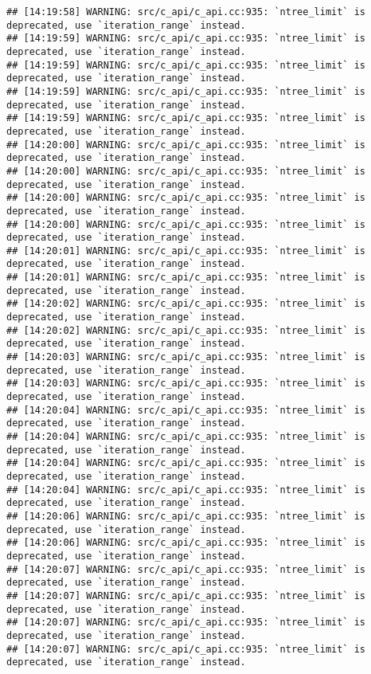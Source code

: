 \documentclass[
]{article}
\begin{document}
\begin{verbatim}
## [14:19:58] WARNING: src/c_api/c_api.cc:935: `ntree_limit` is deprecated, use `iteration_range` instead.
## [14:19:59] WARNING: src/c_api/c_api.cc:935: `ntree_limit` is deprecated, use `iteration_range` instead.
## [14:19:59] WARNING: src/c_api/c_api.cc:935: `ntree_limit` is deprecated, use `iteration_range` instead.
## [14:19:59] WARNING: src/c_api/c_api.cc:935: `ntree_limit` is deprecated, use `iteration_range` instead.
## [14:19:59] WARNING: src/c_api/c_api.cc:935: `ntree_limit` is deprecated, use `iteration_range` instead.
## [14:20:00] WARNING: src/c_api/c_api.cc:935: `ntree_limit` is deprecated, use `iteration_range` instead.
## [14:20:00] WARNING: src/c_api/c_api.cc:935: `ntree_limit` is deprecated, use `iteration_range` instead.
## [14:20:00] WARNING: src/c_api/c_api.cc:935: `ntree_limit` is deprecated, use `iteration_range` instead.
## [14:20:00] WARNING: src/c_api/c_api.cc:935: `ntree_limit` is deprecated, use `iteration_range` instead.
## [14:20:01] WARNING: src/c_api/c_api.cc:935: `ntree_limit` is deprecated, use `iteration_range` instead.
## [14:20:01] WARNING: src/c_api/c_api.cc:935: `ntree_limit` is deprecated, use `iteration_range` instead.
## [14:20:02] WARNING: src/c_api/c_api.cc:935: `ntree_limit` is deprecated, use `iteration_range` instead.
## [14:20:02] WARNING: src/c_api/c_api.cc:935: `ntree_limit` is deprecated, use `iteration_range` instead.
## [14:20:03] WARNING: src/c_api/c_api.cc:935: `ntree_limit` is deprecated, use `iteration_range` instead.
## [14:20:03] WARNING: src/c_api/c_api.cc:935: `ntree_limit` is deprecated, use `iteration_range` instead.
## [14:20:04] WARNING: src/c_api/c_api.cc:935: `ntree_limit` is deprecated, use `iteration_range` instead.
## [14:20:04] WARNING: src/c_api/c_api.cc:935: `ntree_limit` is deprecated, use `iteration_range` instead.
## [14:20:04] WARNING: src/c_api/c_api.cc:935: `ntree_limit` is deprecated, use `iteration_range` instead.
## [14:20:04] WARNING: src/c_api/c_api.cc:935: `ntree_limit` is deprecated, use `iteration_range` instead.
## [14:20:06] WARNING: src/c_api/c_api.cc:935: `ntree_limit` is deprecated, use `iteration_range` instead.
## [14:20:06] WARNING: src/c_api/c_api.cc:935: `ntree_limit` is deprecated, use `iteration_range` instead.
## [14:20:07] WARNING: src/c_api/c_api.cc:935: `ntree_limit` is deprecated, use `iteration_range` instead.
## [14:20:07] WARNING: src/c_api/c_api.cc:935: `ntree_limit` is deprecated, use `iteration_range` instead.
## [14:20:07] WARNING: src/c_api/c_api.cc:935: `ntree_limit` is deprecated, use `iteration_range` instead.
## [14:20:07] WARNING: src/c_api/c_api.cc:935: `ntree_limit` is deprecated, use `iteration_range` instead.

\end{verbatim}
\end{document}
